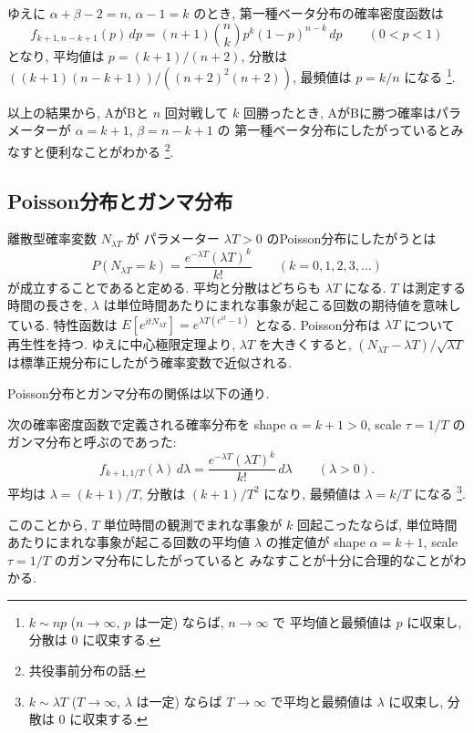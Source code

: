 \documentclass[12pt,twoside]{jarticle}
\theoremstyle{jplain}
\theoremstyle{jplain}
\theoremstyle{jplain}
\numberwithin{theorem}{section}
\numberwithin{equation}{section}
\numberwithin{figure}{section}
\numberwithin{table}{section}
\begin{document}
ゆえに $\alpha+\beta-2=n$, $\alpha-1=k$ のとき, 
第一種ベータ分布の確率密度函数は
\[
f_{k+1,n-k+1}(p)\,dp
=(n+1)\binom{n}{k} p^k(1-p)^{n-k}\,dp
\qquad (0<p<1)
\]
となり, 平均値は $p=(k+1)/(n+2)$, 分散は $((k+1)(n-k+1))/((n+2)^2(n+2))$, 
最頻値は $p=k/n$ になる%
\footnote{$k\sim np$ ($n\to\infty$, $p$ は一定) ならば, $n\to\infty$ で
平均値と最頻値は $p$ に収束し, 分散は $0$ に収束する.}.

以上の結果から, AがBと $n$ 回対戦して $k$ 回勝ったとき, 
AがBに勝つ確率はパラメーターが $\alpha=k+1$, $\beta=n-k+1$ の
第一種ベータ分布にしたがっているとみなすと便利なことがわかる%
\footnote{共役事前分布の話.}.


\subsection{Poisson分布とガンマ分布}
\label{sec:Poisson-Gamma}

離散型確率変数 $N_{\lambda T}$ が
パラメーター $\lambda T>0$ のPoisson分布にしたがうとは
\[
P(N_{\lambda T}=k) = \frac{e^{-\lambda T}(\lambda T)^k}{k!}
\qquad (k=0,1,2,3,\ldots)
\]
が成立することであると定める.  
平均と分散はどちらも $\lambda T$ になる.
$T$ は測定する時間の長さを, 
$\lambda$ は単位時間あたりにまれな事象が起こる回数の期待値を意味している.
特性函数は $E[e^{itN_{\lambda T}}]=e^{\lambda T(e^{it}-1)}$ となる.
Poisson分布は $\lambda T$ について再生性を持つ.
ゆえに中心極限定理より,  $\lambda T$ を大きくすると, 
$(N_{\lambda T}-\lambda T)/\sqrt{\lambda T}$ は標準正規分布にしたがう確率変数で近似される.

Poisson分布とガンマ分布の関係は以下の通り.

次の確率密度函数で定義される確率分布を
shape $\alpha=k+1>0$, scale $\tau=1/T$ のガンマ分布と呼ぶのであった:
\[
f_{k+1,1/T}(\lambda)\,d\lambda
=\frac{e^{-\lambda T}(\lambda T)^k}{k!}\,d\lambda
\qquad (\lambda>0).
\]
平均は $\lambda=(k+1)/T$, 分散は $(k+1)/T^2$ になり,  
最頻値は $\lambda=k/T$ になる%
\footnote{$k\sim\lambda T$ ($T\to\infty$, $\lambda$ は一定) 
ならば $T\to\infty$ で平均と最頻値は $\lambda$
に収束し, 分散は $0$ に収束する.}.

このことから, $T$ 単位時間の観測でまれな事象が $k$ 回起こったならば, 
単位時間あたりにまれな事象が起こる回数の平均値 $\lambda$ の推定値が
shape $\alpha=k+1$, scale $\tau=1/T$ のガンマ分布にしたがっていると
みなすことが十分に合理的なことがわかる.

\end{document}

